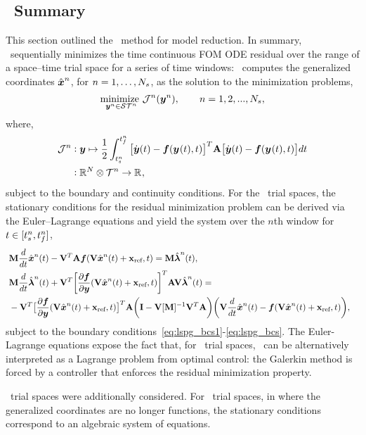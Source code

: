 



\subsection{\methodAcronym\ Summary}
This section outlined the \methodAcronym\ method for model reduction. In summary, \methodAcronym\ sequentially minimizes the time continuous FOM ODE residual over the range of a space--time trial space for a series of time windows: \methodAcronym\  
computes the generalized coordinates $\genstateArgnt{n}$, for $n = 1,\ldots,\nslabs$, as the solution to the minimization problems,
\begin{equation*}
\underset{\stateyArgnt{n} \in \stspace^n}{\text{minimize } }
\mathcal{J}^n(\stateyArgnt{n}), \qquad n = 1,2,...,\nslabs,
\end{equation*}
where,
\begin{align*}
\mathcal{J}^n &\vcentcolon \statey \mapsto
\frac{1}{2} \int_{\timeStartArg{n}}^{\timeEndArg{n}} \big[ \dot{\statey}(t)
- \velocity(\stateyArg{}{t},t) \big]^T \stweightingMatArg{n} \big[
\dot{\statey}(t) - \velocity(\stateyArg{}{t},t) \big] d t \\
&\vcentcolon \RR{\fomdim}\otimes \timeSpaceArg{n} \rightarrow
\RR{},
\end{align*}
subject to the boundary and continuity conditions. For the \spatialAcronym\ trial spaces, the stationary conditions for the residual minimization problem can be derived via the Euler--Lagrange equations and yield the system over the $n$th window for $t \in [\timeStartArg{n},\timeEndArg{n}]$,
\begin{align*}\
&\mass \frac{d}{dt} \genstateArg{n}{t}  -  \basisspace^T
\stweightingMatArgt{n}{t} \velocity(\veloargsromn) =  \mass \adjointArg{n}{t} , \\
 &\mass \frac{d}{dt} \adjointArg{n}{t}  + \basisspace^T \bigg[\frac{\partial
\velocity}{\partial \statey} (\veloargsromn) \bigg]^T \stweightingMatArgt{n}{t} \basisspace
 \adjointArg{n}{t} = \nonumber \\ 
&-\basisspace^T \big[
\frac{\partial \velocity}{\partial \statey}(\veloargsromn) \big]^T \stweightingMatArgt{n}{t} \bigg( \mathbf{I} -
\basisspace [\massArgt{n}{t}]^{-1} \basisspace^T \stweightingMatArgt{n}{t} \bigg)
 \bigg( \basisspace \frac{d}{dt}\genstateArg{n}{t}  -
\velocity(\veloargsromn) \bigg),  &
\end{align*} 
subject to the boundary conditions~\eqref{eq:lspg_bcs1}-\eqref{eq:lspg_bcs}. The Euler-Lagrange equations expose the fact that, for \spatialAcronym\
trial spaces, \methodAcronym\ can be alternatively interpreted as a Lagrange problem from optimal control: the Galerkin method is forced by a 
controller that enforces the residual minimization property. 

\spaceTimeAcronym\ trial spaces were additionally considered. For \spaceTimeAcronym\ trial spaces, in where the generalized coordinates are no longer functions, the stationary conditions correspond to an algebraic system of equations.
